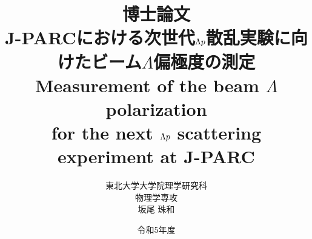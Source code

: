 %

\title{
博士論文 \\
\vspace{30pt}
J-PARCにおける次世代$\Lambda p$散乱実験に向けたビーム$\Lambda$偏極度の測定\\
\vspace{30pt}
Measurement of the beam $\Lambda$ polarization \\for the next $\Lambda p$ scattering experiment at J-PARC\\
}

\author{東北大学大学院理学研究科 \\ \vspace{20pt} 物理学専攻 \\ \vspace{20pt} 坂尾 珠和}
\date{令和5年度}
\maketitle
\thispagestyle{empty}
%
